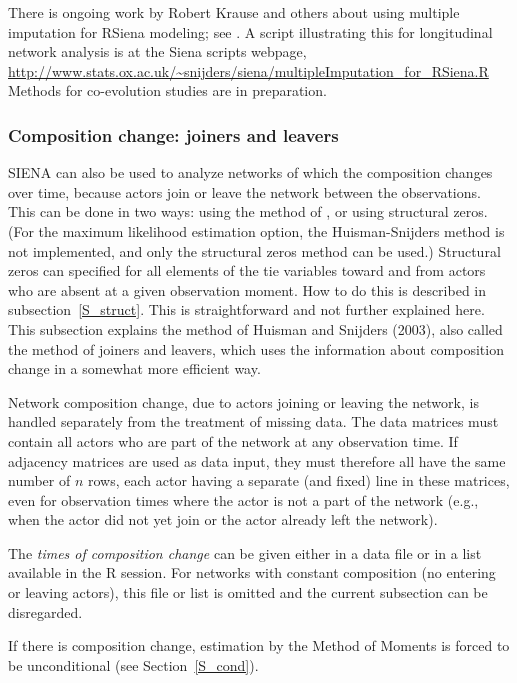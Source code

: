 \documentclass[a4paper,fleqn,11pt]{article}
\newcommand{\+}{\, + \,}
\newcommand{\R}{{\sf R }}
\newcommand{\RS}{{\sf RSiena }}
\newcommand{\SI}{{\sf SIENA }}
\begin{document}
There is ongoing work by Robert Krause and others about using
multiple imputation for \RS modeling;
see \citet{KHS2018}.
A script illustrating this for longitudinal network analysis
is at the Siena scripts webpage,
\url{http://www.stats.ox.ac.uk/~snijders/siena/multipleImputation_for_RSiena.R}
Methods for co-evolution studies are in preparation.


\subsubsection{Composition change: joiners and leavers}
\label{S_comp}

\SI can also be used to analyze networks of which the composition
changes over time, because actors join or leave the network
between the observations.
This can be done in two ways: using the method of \citet{HuismanSnijders03},
or using structural zeros.
(For the maximum likelihood estimation option, the Huisman-Snijders method
is not implemented, and only the structural zeros method can be used.)
Structural zeros can specified for all elements of the tie variables
toward and from actors who are absent at a given observation moment.
How to do this is described in subsection~\ref{S_struct}.
This is straightforward and not further explained here.
This subsection explains the method of Huisman and Snijders
(2003), also called the method of joiners and leavers,
which uses the information about composition change
in a somewhat more efficient way.

Network composition change, due to actors joining or leaving the
network, is handled separately from the treatment of missing data.
The data matrices must contain all actors who are part of the
network at any observation time.
If adjacency matrices are used as data input, they must therefore
all have the same number of $n$ rows, each actor
having a separate (and fixed) line in these matrices, even for
observation times where the actor is not a part of the network
(e.g., when the actor did not yet join or the actor already left
the network).

The \emph{times of composition change} can be given
either in a data file or in a list available in the \R session.
For networks with constant composition
(no entering or leaving actors), this file or list is
omitted and the current subsection can be disregarded.

If there is composition change, estimation by the Method of Moments
is forced to be unconditional (see Section~\ref{S_cond}).
\end{document}
